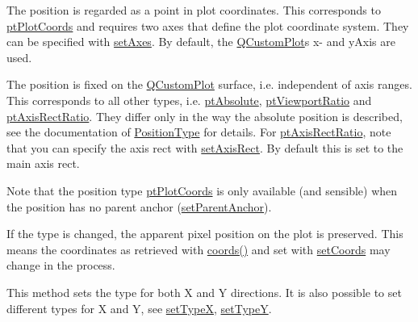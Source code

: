\begin{DoxyItemize}
\item The position is regarded as a point in plot coordinates. This corresponds to \hyperlink{class_q_c_p_item_position_aad9936c22bf43e3d358552f6e86dbdc8ad5ffb8dc99ad73263f7010c77342294c}{pt\+Plot\+Coords} and requires two axes that define the plot coordinate system. They can be specified with \hyperlink{class_q_c_p_item_position_a2185f45c75ac8cb9be89daeaaad50e37}{set\+Axes}. By default, the \hyperlink{class_q_custom_plot}{Q\+Custom\+Plot}\textquotesingle{}s x-\/ and y\+Axis are used.\end{DoxyItemize}
\begin{DoxyItemize}
\item The position is fixed on the \hyperlink{class_q_custom_plot}{Q\+Custom\+Plot} surface, i.\+e. independent of axis ranges. This corresponds to all other types, i.\+e. \hyperlink{class_q_c_p_item_position_aad9936c22bf43e3d358552f6e86dbdc8a564f5e53e550ead1ec5fc7fc7d0b73e0}{pt\+Absolute}, \hyperlink{class_q_c_p_item_position_aad9936c22bf43e3d358552f6e86dbdc8ac7d6aa89ceacb39658b0d6da061c789a}{pt\+Viewport\+Ratio} and \hyperlink{class_q_c_p_item_position_aad9936c22bf43e3d358552f6e86dbdc8a01080fd00eaf09fa238ef6b73bbfef75}{pt\+Axis\+Rect\+Ratio}. They differ only in the way the absolute position is described, see the documentation of \hyperlink{class_q_c_p_item_position_aad9936c22bf43e3d358552f6e86dbdc8}{Position\+Type} for details. For \hyperlink{class_q_c_p_item_position_aad9936c22bf43e3d358552f6e86dbdc8a01080fd00eaf09fa238ef6b73bbfef75}{pt\+Axis\+Rect\+Ratio}, note that you can specify the axis rect with \hyperlink{class_q_c_p_item_position_a0cd9b326fb324710169e92e8ca0041c2}{set\+Axis\+Rect}. By default this is set to the main axis rect.\end{DoxyItemize}
Note that the position type \hyperlink{class_q_c_p_item_position_aad9936c22bf43e3d358552f6e86dbdc8ad5ffb8dc99ad73263f7010c77342294c}{pt\+Plot\+Coords} is only available (and sensible) when the position has no parent anchor (\hyperlink{class_q_c_p_item_position_ac094d67a95d2dceafa0d50b9db3a7e51}{set\+Parent\+Anchor}).

If the type is changed, the apparent pixel position on the plot is preserved. This means the coordinates as retrieved with \hyperlink{class_q_c_p_item_position_aa4ecf5b04c67049c05d37619e090820b}{coords()} and set with \hyperlink{class_q_c_p_item_position_aa988ba4e87ab684c9021017dcaba945f}{set\+Coords} may change in the process.

This method sets the type for both X and Y directions. It is also possible to set different types for X and Y, see \hyperlink{class_q_c_p_item_position_a2113b2351d6d00457fb3559a4e20c3ea}{set\+TypeX}, \hyperlink{class_q_c_p_item_position_ac2a454aa5a54c1615c50686601ec4510}{set\+TypeY}. \mbox{\label{class_q_c_p_item_position_a2113b2351d6d00457fb3559a4e20c3ea}} 
